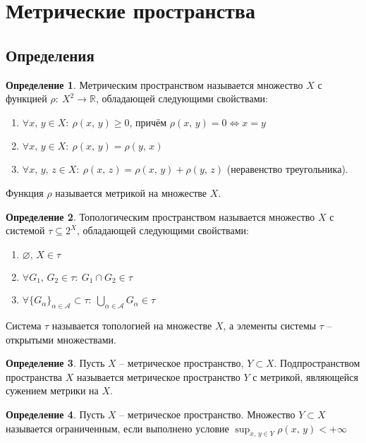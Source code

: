 \documentclass[a4paper,12pt]{article}
\renewcommand{\geq}{\ensuremath{\geqslant}}
\renewcommand{\emptyset}{\ensuremath{\varnothing}}
\theoremstyle{plain}
\theoremstyle{definition}
\newtheorem{definition}{Определение}[section]
\theoremstyle{remark}
\begin{document}
\tableofcontents
\newpage

\section{Метрические пространства}

\subsection{Определения}
\begin{definition}
	Метрическим пространством называется множество $X$ с функцией $\rho :\: X^2 \to \mathbb{R}$, обладающей следующими свойствами:
	\begin{enumerate}
		\item $\forall x,\, y \in X :\: \rho(x,\,y) \geq 0$, причём $\rho(x,\,y) = 0 \Leftrightarrow x = y$
		\item $\forall x,\, y \in X :\: \rho(x,\,y) = \rho(y,\,x)$
		\item $\forall x,\,y,\,z \in X :\: \rho(x,\, z) = \rho(x,\,y) + \rho(y,\,z)$ (неравенство треугольника).
	\end{enumerate}
	Функция $\rho$ называется метрикой на множестве $X$.
\end{definition}

\begin{definition}
	Топологическим пространством называется множество $X$ с системой $\tau \subseteq 2^X$, обладающей следующими свойствами:
	\begin{enumerate}
		\item $\emptyset,\, X \in \tau$
		\item $\forall G_1,\, G_2 \in \tau :\: G_1 \cap G_2 \in \tau$
		\item $\forall \{G_\alpha\}_{\alpha \in \mathcal{A}} \subset \tau :\: \bigcup_{\alpha \in \mathcal{A}} G_\alpha \in \tau$
	\end{enumerate}
	Система $\tau$ называется топологией на множестве $X$, а элементы системы $\tau$ -- открытыми множествами.
\end{definition}

\begin{definition}
	Пусть $X$ -- метрическое пространство, $Y \subset X$. Подпространством пространства $X$ называется метрическое пространство $Y$ с метрикой, являющейся сужением метрики на $X$.
\end{definition}

\begin{definition}
	Пусть $X$ -- метрическое пространство. Множество $Y \subset X$ называется ограниченным, если выполнено условие $\sup_{x,\, y \in Y}\rho(x,\,y) < +\infty$
\end{definition}
\end{document}
